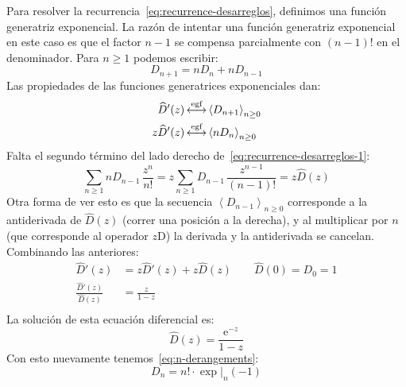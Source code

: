   Para resolver la recurrencia~\eqref{eq:recurrence-desarreglos},
  definimos una función generatriz exponencial.%
  La razón de intentar una función generatriz exponencial
  en este caso
  es que el factor \(n - 1\)
  se compensa parcialmente con \((n - 1)!\) en el denominador.
  Para \(n \ge 1\) podemos escribir:
  \begin{equation}
    \label{eq:recurrence-desarreglos-1}
    D_{n + 1}
      = n D_n + n D_{n - 1}
  \end{equation}
  Las propiedades de las funciones generatrices exponenciales
  dan:
  \begin{align*}
    \widehat{D}'(z)
      &\operatorname{\stackrel{\text{egf}}{\longleftrightarrow}} \left\langle D_{n + 1} \right\rangle_{n \ge 0} \\
    z \widehat{D}'(z)
      &\operatorname{\stackrel{\text{egf}}{\longleftrightarrow}} \left\langle n D_n \right\rangle_{n \ge 0}
  \end{align*}
  Falta el segundo término del lado derecho
  de~\eqref{eq:recurrence-desarreglos-1}:
  \begin{equation*}
    \sum_{n \ge 1} n D_{n - 1} \, \frac{z^n}{n!}
      = z \sum_{n \ge 1} D_{n - 1} \, \frac{z^{n - 1}}{(n - 1)!}
      = z \widehat{D}(z)
  \end{equation*}
  Otra forma de ver esto
  es que la secuencia
    \(\left\langle D_{n - 1} \right\rangle_{n \ge 0}\)
  corresponde a la antiderivada de \(\widehat{D}(z)\)
  (correr una posición a la derecha),
  y al multiplicar por \(n\)
  (que corresponde al operador \(z \mathrm{D}\))
  la derivada y la antiderivada se cancelan.
  Combinando las anteriores:
  \begin{align*}
    \widehat{D}'(z)
      &= z \widehat{D}'(z) + z \widehat{D}(z)
	   \qquad \widehat{D}(0) = D_0 = 1 \\
    \frac{\widehat{D}'(z)}{\widehat{D}(z)}
      &= \frac{z}{1 - z} \\
  \end{align*}
  La solución de esta ecuación diferencial es:%
  \begin{equation*}
    \widehat{D}(z)
      = \frac{\mathrm{e}^{-z}}{1 - z}
  \end{equation*}
  Con esto nuevamente tenemos~\eqref{eq:n-derangements}:
  \begin{equation*}
    D_n
      = n! \cdot  \exp \rvert_n (-1)
  \end{equation*}

